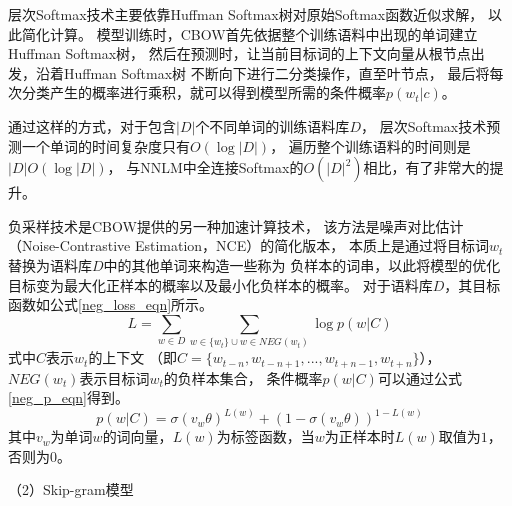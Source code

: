 \documentclass{standalone}
\begin{document}
层次Softmax技术主要依靠Huffman Softmax树对原始Softmax函数近似求解，
以此简化计算。
模型训练时，CBOW首先依据整个训练语料中出现的单词建立Huffman Softmax树，
然后在预测时，让当前目标词的上下文向量从根节点出发，沿着Huffman Softmax树
不断向下进行二分类操作，直至叶节点，
最后将每次分类产生的概率进行乘积，就可以得到模型所需的条件概率$p(w_t|c)$。

通过这样的方式，对于包含$|D|$个不同单词的训练语料库$D$，
层次Softmax技术预测一个单词的时间复杂度只有$O\left ( \log|D| \right )$，
遍历整个训练语料的时间则是$|D|O\left ( \log|D| \right )$，
与NNLM中全连接Softmax的$O\left ( |D|^2 \right )$相比，有了非常大的提升。

负采样技术是CBOW提供的另一种加速计算技术，
该方法是噪声对比估计（Noise-Contrastive Estimation，NCE）的简化版本，
本质上是通过将目标词$w_t$替换为语料库$D$中的其他单词来构造一些称为
负样本的词串，以此将模型的优化目标变为最大化正样本的概率以及最小化负样本的概率。
对于语料库$D$，其目标函数如公式\ref{neg_loss_eqn}所示。
\begin{equation}
    L = \sum_{w\in D} \sum_{w\in \{w_t\} \cup w\in NEG\left ( w_t \right )} \log p\left ( w|C \right )
    \label{neg_loss_eqn}
\end{equation}
式中$C$表示$w_t$的上下文
（即$C=\{w_{t-n},w_{t-n+1},...,w_{t+n-1},w_{t+n}\}$），
$NEG(w_t)$表示目标词$w_t$的负样本集合，
条件概率$p\left ( w|C \right )$可以通过公式\ref{neg_p_eqn}得到。
\begin{equation}
    p\left ( w|C \right )=\sigma\left ( v_w\theta  \right )^{L(w)}+\left ( 1- \sigma\left ( v_w\theta  \right )\right )^{1-L\left ( w \right )}
    \label{neg_p_eqn}
\end{equation}
其中$v_w$为单词$w$的词向量，$L(w)$为标签函数，当$w$为正样本时$L(w)$取值为$1$，否则为$0$。

（2）Skip-gram模型
\end{document}
